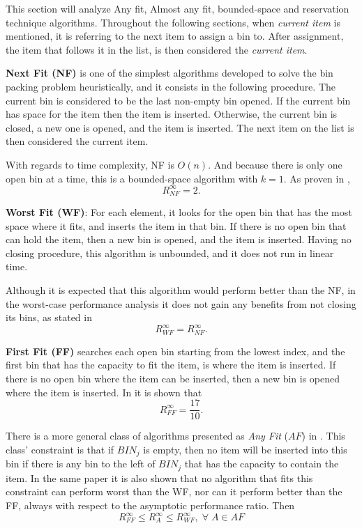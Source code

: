 This section will analyze Any fit, Almost any fit, bounded-space and reservation
technique algorithms.  Throughout the following sections, when \textit{current
item} is mentioned, it is referring to the next item to assign a bin to. After
assignment, the item that follows it in the list, is then considered the
\textit{current item}.

\textbf{Next Fit (NF)} is one of the simplest algorithms developed to solve the
bin packing problem heuristically, and it consists in the following procedure.
The current bin is considered to be the last non-empty bin opened. If the
current bin has space for the item then the item is inserted. Otherwise, the
current bin is closed, a new one is opened, and the item is inserted. The next
item on the list is then considered the current item.

With regards to time complexity, NF is $O(n)$. And because there is only one
open bin at a time, this is a bounded-space algorithm with $k = 1$. As proven in
\cite{johnson1973near}, 
\begin{equation}
    R_{NF}^\infty = 2.
\end{equation}

\textbf{Worst Fit (WF)}: For each element, it looks for the open bin that has
the most space where it fits, and inserts the item in that bin. If there is no
open bin that can hold the item, then a new bin is opened, and the item is
inserted. Having no closing procedure, this algorithm is unbounded, and it does
not run in linear time.

Although it is expected that this algorithm would perform better than the NF, in
the worst-case performance analysis it does not gain any benefits from not
closing its bins, as stated in \cite{man1996approximation}
\begin{equation}
    R_{WF}^\infty = R_{NF}^\infty.
\end{equation}

\textbf{First Fit (FF)} searches each open bin starting from the lowest index,
and the first bin that has the capacity to fit the item, is where the item is
inserted. If there is no open bin where the item can be inserted, then a new bin
is opened where the item is inserted. In \cite{johnson1974worst} it is shown
that
\begin{equation}
    R_{FF}^\infty = \frac{17}{10}.
\end{equation}

There is a more general class of algorithms presented as \textit{Any Fit} ($AF$)
in \cite{johnson1974fast}. This class' constraint is that if $BIN_j$ is empty,
then no item will be inserted into this bin if there is any bin to the left of
$BIN_j$ that has the capacity to contain the item. In the same paper it is also
shown that no algorithm that fits this constraint can perform worst than the WF,
nor can it perform better than the FF, always with respect to the asymptotic
performance ratio. Then
\begin{equation}
    R_{FF}^\infty \leq R_A^\infty \leq R_{WF}^\infty, \; \forall \; A \in AF
\end{equation}

